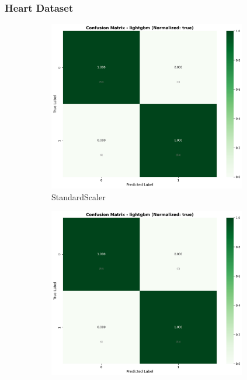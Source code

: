\FloatBarrier

\subsubsection{Heart Dataset}\label{subsubsec:lgbm-heart}

\begin{figure}[H]
\centering
\begin{subfigure}[b]{0.31\textwidth}\centering
\includegraphics[width=0.95\textwidth]{Result/heart_dataset/confusion_matrices/lightgbm_numeric_dataset_StandardScaler.png}
\caption{StandardScaler}\label{fig:lgbm_heart_cm_standard}
\end{subfigure}\hfill
\begin{subfigure}[b]{0.31\textwidth}\centering
\includegraphics[width=0.95\textwidth]{Result/heart_dataset/confusion_matrices/lightgbm_numeric_dataset_MinMaxScaler.png}

\end{subfigure}
\end{figure}
